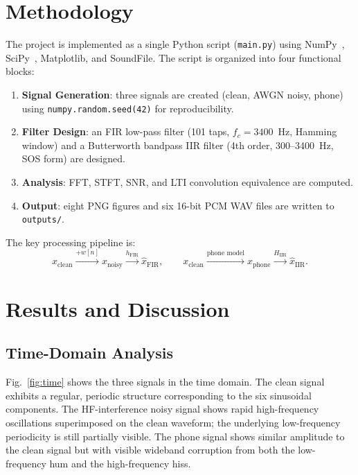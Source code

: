 \documentclass[journal]{IEEEtran}
\begin{document}
\section{Methodology}
\label{sec:method}

The project is implemented as a single Python script (\texttt{main.py}) using
NumPy~\cite{numpy2020}, SciPy~\cite{scipy2020}, Matplotlib, and SoundFile.
The script is organized into four functional blocks:
\begin{enumerate}
  \item \textbf{Signal Generation}: three signals are created (clean, AWGN noisy,
        phone) using \texttt{numpy.random.seed(42)} for reproducibility.
  \item \textbf{Filter Design}: an FIR low-pass filter (101 taps, $f_c=3400$~Hz,
        Hamming window) and a Butterworth bandpass IIR filter (4th order,
        300--3400~Hz, SOS form) are designed.
  \item \textbf{Analysis}: FFT, STFT, SNR, and LTI convolution equivalence are
        computed.
  \item \textbf{Output}: eight PNG figures and six 16-bit PCM WAV files are
        written to \texttt{outputs/}.
\end{enumerate}

The key processing pipeline is:
\begin{equation*}
  x_{\text{clean}} \xrightarrow{+w[n]} x_{\text{noisy}}
    \xrightarrow{h_{\text{FIR}}} \hat{x}_{\text{FIR}},
  \qquad
  x_{\text{clean}} \xrightarrow{\text{phone model}} x_{\text{phone}}
    \xrightarrow{H_{\text{IIR}}} \hat{x}_{\text{IIR}}.
\end{equation*}

\section{Results and Discussion}
\label{sec:results}

\subsection{Time-Domain Analysis}

Fig.~\ref{fig:time} shows the three signals in the time domain. The clean signal
exhibits a regular, periodic structure corresponding to the six sinusoidal
components. The HF-interference noisy signal shows rapid high-frequency oscillations
superimposed on the clean waveform; the underlying low-frequency periodicity is
still partially visible. The phone signal shows similar amplitude to the clean
signal but with visible wideband corruption from both the low-frequency hum and
the high-frequency hiss.
\end{document}
